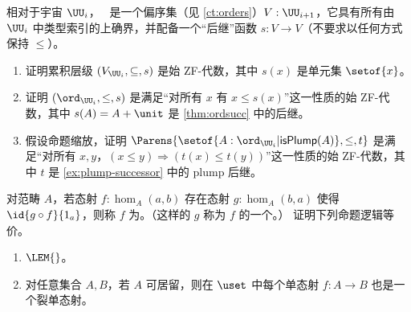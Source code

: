 \begin{ex}\label{ex:ZF-algebras}
  相对于宇宙 $\UU_i$，~\cite{JoyalMoerdijk1995}
  是一个偏序集（见 \cref{ct:orders}）$V:\UU_{i+1}$，它具有所有由 $\UU_i$ 中类型索引的上确界，并配备一个“后继”函数 $s:V\to V$（不要求以任何方式保持 $\le$）。
  \begin{enumerate}
  \item 证明累积层级 $(V_{\UU_i},\subseteq,s)$ 是始 ZF-代数，其中 $s(x)$ 是单元集 $\setof{x}$。
  \item 证明 $(\ord_{\UU_i},\le,s)$ 是满足“对所有 $x$ 有 $x\le s(x)$”这一性质的始 ZF-代数，其中 $s(A)=A+\unit$ 是 \cref{thm:ordsucc} 中的后继。
  \item 假设命题缩放，证明 $\Parens{\setof{A:\ord_{\UU_i} | \mathsf{isPlump}(A) },\le,t}$ 是满足“对所有 $x,y$，$(x\le y) \Rightarrow (t(x)\le t(y))$”这一性质的始 ZF-代数，其中 $t$ 是 \cref{ex:plump-successor} 中的 plump 后继。
  \end{enumerate}
\end{ex}

\begin{ex}\label{ex:monos-are-split-monos-iff-LEM-holds}
  对范畴 $A$，若态射 $f: \hom_A(a,b)$ 存在态射 $g: \hom_A(b,a)$ 使得 $\id{g \circ f}{1_a}$，则称 $f$ 为。（这样的 $g$ 称为 $f$ 的一个。）
  证明下列命题逻辑等价。
  \begin{enumerate}
  \item $\LEM{}$。
  \item 对任意集合 $A,B$，若 $A$ 可居留，则在 $\uset$ 中每个单态射 $f: A \to B$ 也是一个裂单态射。
  \end{enumerate}
\end{ex}

%

